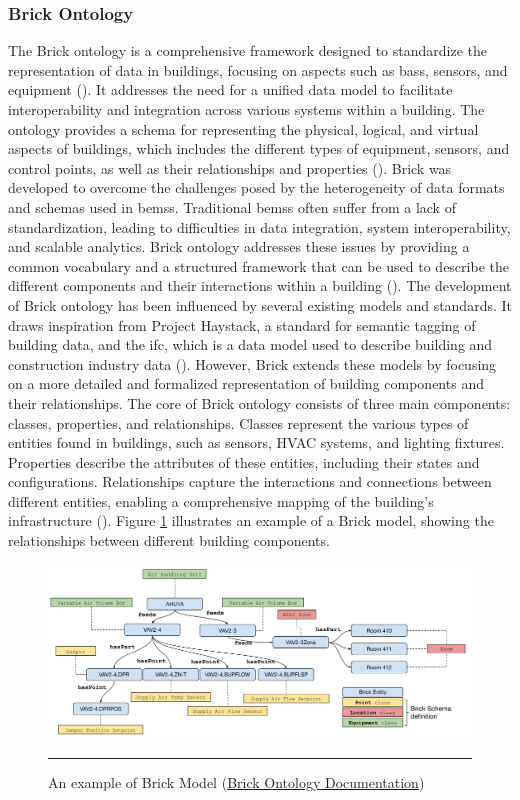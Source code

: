 \subsubsection*{Brick Ontology}
The Brick ontology is a comprehensive framework designed to standardize the representation of data in buildings, focusing on aspects such as \glspl{bas}, sensors, and equipment (\cite{Balaji2016}).
It addresses the need for a unified data model to facilitate interoperability and integration across various systems within a building.
The ontology provides a schema for representing the physical, logical, and virtual aspects of buildings, which includes the different types of equipment, sensors, and control points, as well as their relationships and properties (\cite{Balaji2018}).
Brick was developed to overcome the challenges posed by the heterogeneity of data formats and schemas used in \glspl{bems}. Traditional \glspl{bems} often suffer from a lack of standardization, leading to difficulties in data integration, system interoperability, and scalable analytics.
Brick ontology addresses these issues by providing a common vocabulary and a structured framework that can be used to describe the different components and their interactions within a building (\cite{Balaji2018}).
The development of Brick ontology has been influenced by several existing models and standards.
It draws inspiration from Project Haystack, a standard for semantic tagging of building data, and the \gls{ifc}, which is a data model used to describe building and construction industry data (\cite{Balaji2016}).
However, Brick extends these models by focusing on a more detailed and formalized representation of building components and their relationships.
The core of Brick ontology consists of three main components: classes, properties, and relationships.
Classes represent the various types of entities found in buildings, such as sensors, HVAC systems, and lighting fixtures.
Properties describe the attributes of these entities, including their states and configurations.
Relationships capture the interactions and connections between different entities, enabling a comprehensive mapping of the building's infrastructure (\cite{Balaji2018}).
Figure \ref{fig:brick-model-example} illustrates an example of a Brick model, showing the relationships between different building components.
\begin{figure}[htbp]
    \centering
 \includegraphics[width=.9\textwidth]{03_Figures/literature-review/brick-model-example.png}
     \rule{35em}{0.5pt}
    \caption{An example of Brick Model (\href{https://docs.brickschema.org/brick/concepts.html}{Brick Ontology Documentation})} 
 \label{fig:brick-model-example}
\end{figure}

